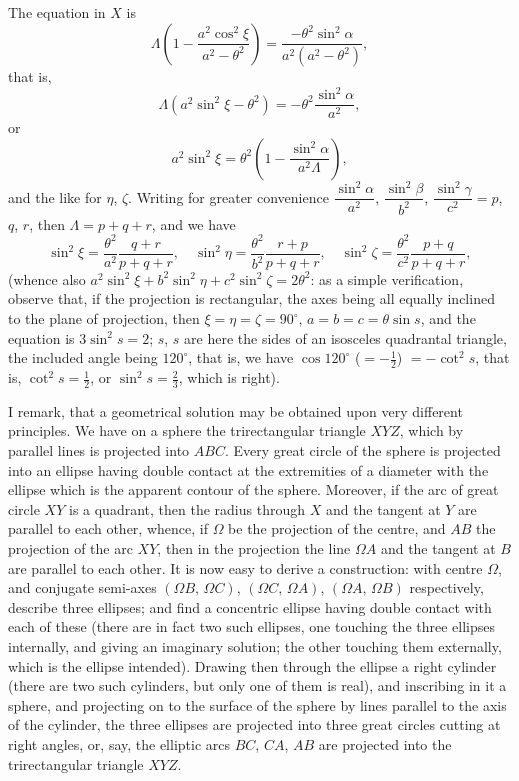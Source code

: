 \documentclass[11pt,a4paper]{book}
\begin{document}
The equation in $X$ is
\[
\Lambda\left(1 - \frac{a^2\cos^2\xi}{a^2-\theta^2}\right) = \frac{-\theta^2\sin^2\alpha}{a^2(a^2-\theta^2)},
\]
that is,
\[
\Lambda(a^2\sin^2\xi - \theta^2) = -\theta^2\frac{\sin^2\alpha}{a^2},
\]
or
\[
a^2\sin^2\xi = \theta^2\left(1 - \frac{\sin^2\alpha}{a^2\Lambda}\right),
\]
and the like for $\eta$, $\zeta$. Writing for greater convenience $\dfrac{\sin^2\alpha}{a^2}$, $\dfrac{\sin^2\beta}{b^2}$, $\dfrac{\sin^2\gamma}{c^2} = p$, $q$, $r$, then $\Lambda = p+q+r$, and we have
\[
\sin^2\xi = \frac{\theta^2}{a^2}\frac{q+r}{p+q+r},\quad \sin^2\eta = \frac{\theta^2}{b^2}\frac{r+p}{p+q+r},\quad \sin^2\zeta = \frac{\theta^2}{c^2}\frac{p+q}{p+q+r},
\]
(whence also $a^2\sin^2\xi + b^2\sin^2\eta + c^2\sin^2\zeta = 2\theta^2$: as a simple verification, observe that, if the projection is rectangular, the axes being all equally inclined to the plane of projection, then $\xi = \eta = \zeta = 90^\circ$, $a = b = c = \theta\sin s$, and the equation is $3\sin^2 s = 2$; $s$, $s$ are here the sides of an isosceles quadrantal triangle, the included angle being $120^\circ$, that is, we have $\cos 120^\circ$ ($= -\tfrac{1}{2}$) $= -\cot^2 s$, that is, $\cot^2 s = \tfrac{1}{2}$, or $\sin^2 s = \tfrac{2}{3}$, which is right).

I remark, that a geometrical solution may be obtained upon very different principles. We have on a sphere the trirectangular triangle $XYZ$, which by parallel lines is projected into $ABC$. Every great circle of the sphere is projected into an ellipse having double contact at the extremities of a diameter with the ellipse which is the apparent contour of the sphere. Moreover, if the arc of great circle $XY$ is a quadrant, then the radius through $X$ and the tangent at $Y$ are parallel to each other, whence, if $\Omega$ be the projection of the centre, and $AB$ the projection of the arc $XY$, then in the projection the line $\Omega A$ and the tangent at $B$ are parallel to each other. It is now easy to derive a construction: with centre $\Omega$, and conjugate semi-axes $(\Omega B,\, \Omega C)$, $(\Omega C,\, \Omega A)$, $(\Omega A,\, \Omega B)$ respectively, describe three ellipses; and find a concentric ellipse having double contact with each of these (there are in fact two such ellipses, one touching the three ellipses internally, and giving an imaginary solution; the other touching them externally, which is the ellipse intended). Drawing then through the ellipse a right cylinder (there are two such cylinders, but only one of them is real), and inscribing in it a sphere, and projecting on to the surface of the sphere by lines parallel to the axis of the cylinder, the three ellipses are projected into three great circles cutting at right angles, or, say, the elliptic arcs $BC$, $CA$, $AB$ are projected into the trirectangular triangle $XYZ$.
\end{document}
